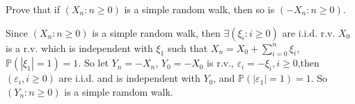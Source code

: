 \documentclass{ctexart}
\newif\ifpreface
\begin{document}
\large
\setlength{\baselineskip}{1.2em}
\ifpreface
  
\else
\fi

\begin{problem}\label{pro:1}
  Prove that if \((X_n:n \geq 0)\) is a simple random walk, then so is \((-X_n:n \geq 0)\).
\end{problem}
\begin{solution}
  Since \((X_n: n \geq 0)\) is a simple random walk, then \(\exists (\xi_i: i \geq 0)\) are i.i.d.
  r.v. \(X_0\) is a r.v. which is independent with \(\xi_1\) such that
  \(X_n= X_0 + \sum_{i=0}^n \xi_i\), \(\mathbb{P}(|\xi_1|=1)=1\).
  So let \(Y_n = -X_n\), \(Y_0=-X_0\) is r.v., \(\varepsilon_i = -\xi_i, i \geq 0\),then
  \((\varepsilon_i, i \geq 0)\) are i.i.d. and is independent with \(Y_0\), and \(\mathbb{P}(|\varepsilon_1|=1)=1\).
  So \((Y_n: n \geq 0)\) is a simple ramdom walk.
\end{solution}
\end{document}
